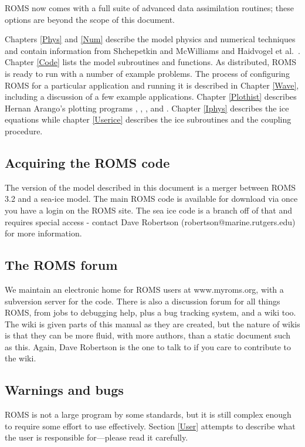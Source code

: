 ROMS now comes with a full suite of advanced data assimilation
routines; these options are beyond the scope of this document.

Chapters \ref{Phys} and \ref{Num} describe the model physics and
numerical techniques and contain information from Shchepetkin and
McWilliams \cite{SS2008b} and Haidvogel et al.\
\cite{Haidvogel07}.
Chapter \ref{Code} lists the model subroutines and functions.
As distributed, ROMS is ready to run with a number of example problems.
The process of configuring ROMS for a particular application and
running it is
described in Chapter \ref{Wave}, including a discussion of a few example
applications.
Chapter \ref{Plothist} describes Hernan Arango's plotting
programs , , , and .
Chapter \ref{Iphys} describes the ice equations while chapter
\ref{Userice} describes the ice subroutines and the coupling procedure.

\subsection{Acquiring the ROMS code}
\label{Svn}
The version of the model described in this document is a merger between
ROMS 3.2 and a sea-ice model. The main ROMS code is available for
download via \code{svn} once you have a login on the ROMS site. The sea ice
code is a branch off of that and requires special access - contact
Dave Robertson (robertson@marine.rutgers.edu) for more information.

\subsection{The ROMS forum}
We maintain an electronic home for ROMS users at www.myroms.org,
with a subversion server for the code. There is also a discussion
forum for all things ROMS, from jobs to debugging help, plus a
bug tracking system, and a wiki too. The wiki is given parts of
this manual as they are created, but the nature of wikis is that
they can be more fluid, with more authors, than a static document such
as this. Again, Dave Robertson is the one to talk to if you care to
contribute to the wiki.

\subsection{Warnings and bugs}
ROMS is not a large program by some standards, but it is still complex
enough to require some effort to use effectively.  Section \ref{User}
attempts to describe what the user is responsible for---please read
it carefully.

